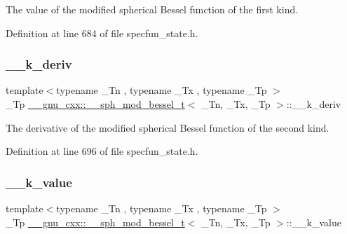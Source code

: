 The value of the modified spherical Bessel function of the first kind. 



Definition at line 684 of file specfun\+\_\+state.\+h.

\mbox{\label{struct____gnu__cxx_1_1____sph__mod__bessel__t_a4a291581457934e9d05c21e2acbedbc5}} 
\subsubsection{\texorpdfstring{\+\_\+\+\_\+k\+\_\+deriv}{\_\_k\_deriv}}
{\footnotesize\ttfamily template$<$typename \+\_\+\+Tn , typename \+\_\+\+Tx , typename \+\_\+\+Tp $>$ \\
\+\_\+\+Tp \hyperlink{struct____gnu__cxx_1_1____sph__mod__bessel__t}{\+\_\+\+\_\+gnu\+\_\+cxx\+::\+\_\+\+\_\+sph\+\_\+mod\+\_\+bessel\+\_\+t}$<$ \+\_\+\+Tn, \+\_\+\+Tx, \+\_\+\+Tp $>$\+::\+\_\+\+\_\+k\+\_\+deriv}



The derivative of the modified spherical Bessel function of the second kind. 



Definition at line 696 of file specfun\+\_\+state.\+h.

\mbox{\label{struct____gnu__cxx_1_1____sph__mod__bessel__t_af0e430aef3e7053de5474206d6f13830}} 
\subsubsection{\texorpdfstring{\+\_\+\+\_\+k\+\_\+value}{\_\_k\_value}}
{\footnotesize\ttfamily template$<$typename \+\_\+\+Tn , typename \+\_\+\+Tx , typename \+\_\+\+Tp $>$ \\
\+\_\+\+Tp \hyperlink{struct____gnu__cxx_1_1____sph__mod__bessel__t}{\+\_\+\+\_\+gnu\+\_\+cxx\+::\+\_\+\+\_\+sph\+\_\+mod\+\_\+bessel\+\_\+t}$<$ \+\_\+\+Tn, \+\_\+\+Tx, \+\_\+\+Tp $>$\+::\+\_\+\+\_\+k\+\_\+value}



